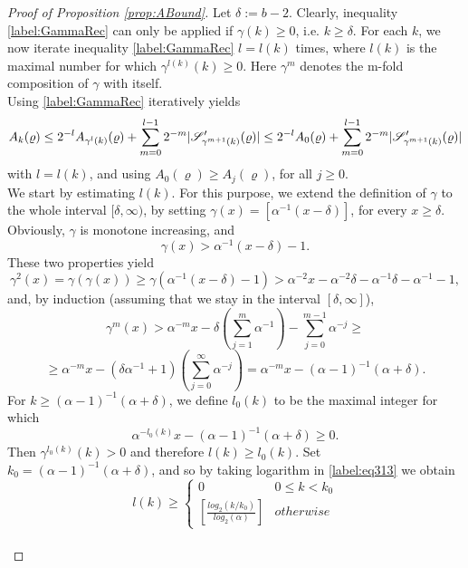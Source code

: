 \documentclass[11pt,reqno]{article}
\DeclarePairedDelimiter\abs{\lvert}{\rvert}%
\theoremstyle{definition}
\newcommand{\twopartdef}[4]
{
	\left\{
		\begin{array}{ll}
			#1 & #2 \\
			#3 & #4
		\end{array}
	\right.
}
\begin{document}
\begin{proof}[Proof of Proposition \eqref{prop:ABound}]
Let $\delta:=b-2$. Clearly, inequality \eqref{label:GammaRec} can only be applied if $\gamma(k) \geq 0$, i.e. $k \geq \delta$. For each $k$, we now iterate inequality \eqref{label:GammaRec} $l=l(k)$ times, where $l(k)$ is the maximal number for which $\gamma^{l(k)}(k) \geq 0$. Here $\gamma^m$ denotes the m-fold composition of $\gamma$ with itself.\\
Using \eqref{label:GammaRec} iteratively yields
\begin{equation} \label{label:lab310}
A_k(\varrho) \leq 
2^{-l}A_{\gamma^l(k)}(\varrho) + \sum_{m=0}^{l-1} 2^{-m} \abs{\mathscr{S}^\prime_{\gamma^{m+1}(k)}(\varrho)} \leq 
2^{-l}A_0(\varrho) + \sum_{m=0}^{l-1} 2^{-m} \abs{\mathscr{S}^\prime_{\gamma^{m+1}(k)}(\varrho)}
\end{equation}
with $l=l(k)$, and using $A_0(\varrho) \geq A_j(\varrho)$, for all $j \geq 0$.\\

We start by estimating $l(k)$. For this purpose, we extend the definition of $\gamma$ to the whole interval $[\delta, \infty)$, by setting $\gamma(x)=[\alpha^{-1}(x-\delta)]$, for every $x \geq \delta$. Obviously, $\gamma$ is monotone increasing, and
$$\gamma(x) > \alpha^{-1}(x-\delta)-1.$$
These two properties yield
$$\gamma^2(x) = \gamma(\gamma(x)) \geq \gamma(\alpha^{-1}(x-\delta)-1) > 
\alpha^{-2}x - \alpha^{-2}\delta - \alpha^{-1}\delta - \alpha^{-1} - 1,$$
and, by induction (assuming that we stay in the interval $[\delta, \infty]$),
\newcommand*{\alphadelta}{(\alpha-1)^{-1}(\alpha+\delta)}
$$
\gamma^m(x) > \alpha^{-m}x - \delta (\sum_{j=1}^m \alpha^{-1}) - \sum_{j=0}^{m-1}\alpha^{-j} \geq
$$
$$
\geq \alpha^{-m}x - (\delta\alpha^{-1}+1)(\sum_{j=0}^\infty\alpha^{-j}) = 
\alpha^{-m}x - \alphadelta.
$$
For $k \geq \alphadelta$, we define $l_0(k)$ to be the maximal integer for which
\begin{equation} \label{label:eq313}
\alpha^{-l_0(k)}x - \alphadelta \geq 0.
\end{equation}
Then $\gamma^{l_0(k)}(k) > 0$ and therefore $l(k) \geq l_0(k)$. Set $k_0=(\alpha-1)^{-1}(\alpha+\delta)$, and so by taking logarithm in \eqref{label:eq313} we obtain
\begin{equation} \label{label:eq314}
l(k) \geq \twopartdef { 0 } {0 \leq k < k_0} {{[\frac{log_2(k/k_0)}{log_2(\alpha)}]}} {otherwise}
\end{equation}\\


\end{proof}
\end{document}
